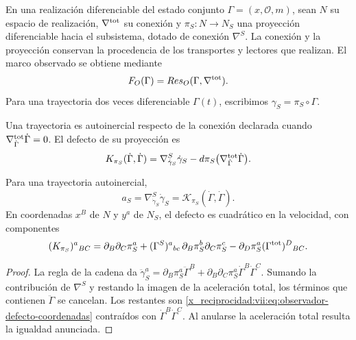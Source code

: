 En una realización diferenciable del estado conjunto
\(\Gamma=(x,\mathcal O,m)\), sean \(N\) su espacio de realización,
\(\nabla^{\rm tot}\) su conexión y \(\pi_S:N\to N_S\) una
proyección diferenciable hacia el subsistema, dotado de conexión
\(\nabla^S\). La conexión y la proyección conservan la procedencia
de los transportes y lectores que realizan. El marco observado se
obtiene mediante
\[
 \mathfrak F_{\mathcal O}(\Gamma)
 =\operatorname{Res}_{\mathcal O}(\Gamma,\nabla^{\rm tot}).
\]
Para una trayectoria dos veces diferenciable \(\Gamma(t)\),
escribimos \(\gamma_S=\pi_S\circ\Gamma\).

\begin{definition}
\label{x_reciprocidad:vii:def:observador-autoinercia}
Una trayectoria es autoinercial respecto de la conexión declarada
cuando \(\nabla^{\rm tot}_{\dot\Gamma}\dot\Gamma=0\).
El defecto de su proyección es
\begin{equation}
 \mathcal K_{\pi_S}(\dot\Gamma,\dot\Gamma)
 =\nabla^S_{\dot\gamma_S}\dot\gamma_S
  -d\pi_S\bigl(\nabla^{\rm tot}_{\dot\Gamma}\dot\Gamma\bigr).
 \label{x_reciprocidad:vii:eq:observador-defecto-proyeccion}
\end{equation}
\end{definition}

\begin{proposition}
\label{x_reciprocidad:vii:prop:observador-aceleracion}
Para una trayectoria autoinercial,
\[
 a_S=\nabla^S_{\dot\gamma_S}\dot\gamma_S
     =\mathcal K_{\pi_S}(\dot\Gamma,\dot\Gamma).
\]
En coordenadas \(x^B\) de \(N\) y \(y^a\) de \(N_S\), el
defecto es cuadrático en la velocidad, con componentes
\begin{equation}
 (\mathcal K_{\pi_S})^a{}_{BC}
 =\partial_B\partial_C\pi_S^a
  +(\Gamma^S)^a{}_{bc}\,
        \partial_B\pi_S^b\partial_C\pi_S^c
  -\partial_D\pi_S^a(\Gamma^{\rm tot})^D{}_{BC}.
 \label{x_reciprocidad:vii:eq:observador-defecto-coordenadas}
\end{equation}
\end{proposition}

\begin{proof}
La regla de la cadena da
\(\ddot\gamma_S^a=\partial_B\pi_S^a\ddot\Gamma^B
 +\partial_B\partial_C\pi_S^a\dot\Gamma^B\dot\Gamma^C\).
Sumando la contribución de \(\nabla^S\) y restando la imagen de
la aceleración total, los términos que contienen \(\ddot\Gamma\)
se cancelan. Los restantes son
\eqref{x_reciprocidad:vii:eq:observador-defecto-coordenadas} contraídos con
\(\dot\Gamma^B\dot\Gamma^C\). Al anularse la aceleración total
resulta la igualdad anunciada.
\end{proof}

